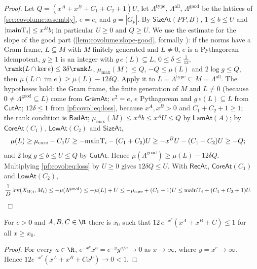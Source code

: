 \begin{proof}
Let $Q=(x^A+x^B+C_1+C_2+1)U$, let $\Lambda^{\mathrm{type}}$, $\Lambda^{\mathrm{all}}$,
$\Lambda^{\mathrm{good}}$ be the lattices of \cref{sec:covolume:assembly}, $e=e_i$ and $g=|G_p|$. By
$\mathsf{SizeAt}(PP,B)$, $1\le b\le U$ and $|\mathrm{mainT}_i|\le x^Bb$; in particular $U\ge0$ and $Q\ge U$.
We use the estimate for the slope of the good part (\cref{lem:covolume:slope-good}, formally
): if the norms have a Gram frame, $L\subseteq M$ with $M$
finitely generated and $L\ne0$, $e$ is a Pythagorean idempotent, $g\ge1$ is an integer with
$g\,e(L)\subseteq L$, $0\le\delta\le\frac1{12}$, $\rank(L\cap\ker e)\le3\delta\rank L$,
$\mu_{\max}(M)\le Q$, $-Q\le\mu(L)$ and $2\log g\le Q$, then $\mu(L\cap\operatorname{im}e)\ge\mu(L)-12\delta Q$.
Apply it to $L=\Lambda^{\mathrm{type}}\subseteq M=\Lambda^{\mathrm{all}}$. The hypotheses hold: the Gram
frame, the finite generation of $M$ and $L\ne0$ (because $0\ne\Lambda^{\mathrm{good}}\subseteq L$) come
from $\mathsf{GramAt}$; $e^2=e$, $e$ Pythagorean and $g\,e(L)\subseteq L$ from $\mathsf{CutAt}$;
$12\delta\le1$ from \eqref{pf:covol:eq:loss}, because $x^A,x^B>0$ and $C_1+C_2+1\ge1$; the rank condition
is $\mathsf{BadAt}$; $\mu_{\max}(M)\le x^Ab\le x^AU\le Q$ by $\mathsf{LamAt}(A)$; by $\mathsf{CoreAt}(C_1)$,
$\mathsf{LowAt}(C_2)$ and $\mathsf{SizeAt}$,
\[
\mu(L)\ge\mu_{\mathrm{core}}-C_1U\ge-\mathrm{mainT}_i-(C_1+C_2)U\ge-x^BU-(C_1+C_2)U\ge-Q;
\]
and $2\log g\le b\le U\le Q$ by $\mathsf{CutAt}$. Hence $\mu(\Lambda^{\mathrm{good}})\ge\mu(L)-12\delta Q$.
Multiplying \eqref{pf:covol:eq:loss} by $U\ge0$ gives $12\delta Q\le U$. With $\mathsf{RecAt}$,
$\mathsf{CoreAt}(C_1)$ and $\mathsf{LowAt}(C_2)$,
\[
\frac1D\operatorname{lcv}(X_{W,i},M_i)\le-\mu(\Lambda^{\mathrm{good}})\le-\mu(L)+U\le-\mu_{\mathrm{core}}+(C_1+1)U
\le\mathrm{mainT}_i+(C_1+C_2+1)U.\qedhere
\]
\end{proof}

\begin{lemma}\label{pf:covol:lem:loss}
For $c>0$ and $A,B,C\in\R$ there is $x_0$ such that $12\,e^{-x^c}(x^A+x^B+C)\le1$ for all $x\ge x_0$.
\end{lemma}

\begin{proof}
For every $a\in\R$, $e^{-x^c}x^a=e^{-y}y^{a/c}\to0$ as $x\to\infty$, where $y=x^c\to\infty$. Hence
$12e^{-x^c}(x^A+x^B+Cx^0)\to0<1$.
\end{proof}

